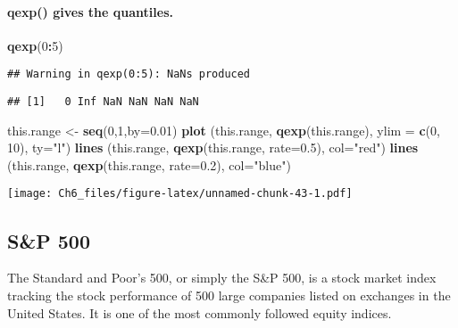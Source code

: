 \documentclass[
]{article}
\newenvironment{Shaded}{\begin{snugshade}}{\end{snugshade}}
\newcommand{\AttributeTok}[1]{\textcolor[rgb]{0.13,0.29,0.53}{#1}}
\newcommand{\DecValTok}[1]{\textcolor[rgb]{0.00,0.00,0.81}{#1}}
\newcommand{\FloatTok}[1]{\textcolor[rgb]{0.00,0.00,0.81}{#1}}
\newcommand{\FunctionTok}[1]{\textcolor[rgb]{0.13,0.29,0.53}{\textbf{#1}}}
\newcommand{\NormalTok}[1]{#1}
\newcommand{\OtherTok}[1]{\textcolor[rgb]{0.56,0.35,0.01}{#1}}
\newcommand{\SpecialCharTok}[1]{\textcolor[rgb]{0.81,0.36,0.00}{\textbf{#1}}}
\newcommand{\StringTok}[1]{\textcolor[rgb]{0.31,0.60,0.02}{#1}}
\begin{document}
\paragraph{qexp() gives the quantiles.}\label{qexp-gives-the-quantiles.}

\begin{Shaded}
\begin{Highlighting}[]
\FunctionTok{qexp}\NormalTok{(}\DecValTok{0}\SpecialCharTok{:}\DecValTok{5}\NormalTok{)}
\end{Highlighting}
\end{Shaded}

\begin{verbatim}
## Warning in qexp(0:5): NaNs produced
\end{verbatim}

\begin{verbatim}
## [1]   0 Inf NaN NaN NaN NaN
\end{verbatim}

\begin{Shaded}
\begin{Highlighting}[]
\NormalTok{this.range }\OtherTok{\textless{}{-}} \FunctionTok{seq}\NormalTok{(}\DecValTok{0}\NormalTok{,}\DecValTok{1}\NormalTok{,}\AttributeTok{by=}\FloatTok{0.01}\NormalTok{)}
\FunctionTok{plot}\NormalTok{ (this.range, }\FunctionTok{qexp}\NormalTok{(this.range), }\AttributeTok{ylim =} \FunctionTok{c}\NormalTok{(}\DecValTok{0}\NormalTok{, }\DecValTok{10}\NormalTok{), }\AttributeTok{ty=}\StringTok{"l"}\NormalTok{)}
\FunctionTok{lines}\NormalTok{ (this.range, }\FunctionTok{qexp}\NormalTok{(this.range, }\AttributeTok{rate=}\FloatTok{0.5}\NormalTok{), }\AttributeTok{col=}\StringTok{"red"}\NormalTok{)}
\FunctionTok{lines}\NormalTok{ (this.range, }\FunctionTok{qexp}\NormalTok{(this.range, }\AttributeTok{rate=}\FloatTok{0.2}\NormalTok{), }\AttributeTok{col=}\StringTok{"blue"}\NormalTok{)}
\end{Highlighting}
\end{Shaded}

\texttt{[image: Ch6\_files/figure-latex/unnamed-chunk-43-1.pdf]}

\subsection{S\&P 500}\label{sp-500}

The Standard and Poor's 500, or simply the S\&P 500, is a stock market
index tracking the stock performance of 500 large companies listed on
exchanges in the United States. It is one of the most commonly followed
equity indices.
\end{document}
